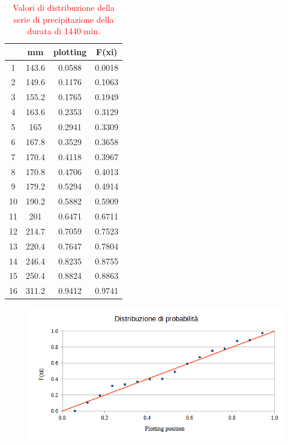 \begin{table}[H] \centering
    \caption{\textcolor{red}{Valori di distribuzione della serie di precipitazione della durata di 1440 min.}}
            \begin{tabular}{cccc}
            \toprule
               & mm    & plotting & F(xi)  \\
            \midrule
            1  & 143.6 & 0.0588   & 0.0018 \\
            2  & 149.6 & 0.1176   & 0.1063 \\
            3  & 155.2 & 0.1765   & 0.1949 \\
            4  & 163.6 & 0.2353   & 0.3129 \\
            5  & 165   & 0.2941   & 0.3309 \\
            6  & 167.8 & 0.3529   & 0.3658 \\
            7  & 170.4 & 0.4118   & 0.3967 \\
            8  & 170.8 & 0.4706   & 0.4013 \\
            9  & 179.2 & 0.5294   & 0.4914 \\
            10 & 190.2 & 0.5882   & 0.5909 \\
            11 & 201   & 0.6471   & 0.6711 \\
            12 & 214.7 & 0.7059   & 0.7523 \\
            13 & 220.4 & 0.7647   & 0.7804 \\
            14 & 246.4 & 0.8235   & 0.8755 \\
            15 & 250.4 & 0.8824   & 0.8863 \\
            16 & 311.2 & 0.9412   & 0.9741 \\
            \bottomrule
            \end{tabular}
\end{table}

\begin{figure}[H]\centering
    \includegraphics[scale=0.75]{immagini/distr_prob_1440min.png}
\end{figure}
